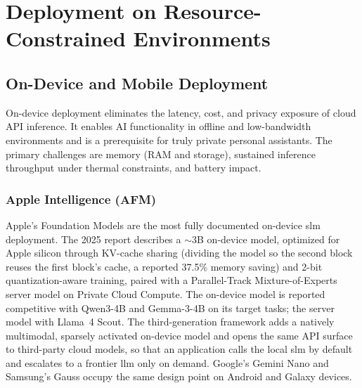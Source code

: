 
\section{Deployment on Resource-Constrained Environments}
\label{sec:deployment}

\subsection{On-Device and Mobile Deployment}
\label{subsec:deployment_mobile}

On-device deployment eliminates the latency, cost, and privacy exposure of cloud API inference. It enables AI functionality in offline and low-bandwidth environments and is a prerequisite for truly private personal assistants. The primary challenges are memory (RAM and storage), sustained inference throughput under thermal constraints, and battery impact.

\subsubsection{Apple Intelligence (AFM)}

Apple's Foundation Models \citep{apple2024intelligence,gunter2025afm} are the most fully documented on-device \gls{slm} deployment. The 2025 report \citep{gunter2025afm} describes a $\sim$3B on-device model, optimized for Apple silicon through KV-cache sharing (dividing the model so the second block reuses the first block's cache, a reported 37.5\% memory saving) and 2-bit quantization-aware training, paired with a Parallel-Track Mixture-of-Experts server model on Private Cloud Compute. The on-device model is reported competitive with Qwen3-4B and Gemma-3-4B on its target tasks; the server model with Llama~4 Scout. The third-generation framework \citep{apple2026afm3} adds a natively multimodal, sparsely activated on-device model and opens the same API surface to third-party cloud models, so that an application calls the local \gls{slm} by default and escalates to a frontier \gls{llm} only on demand. Google's Gemini Nano and Samsung's Gauss \citep{samsung2023gauss} occupy the same design point on Android and Galaxy devices.

